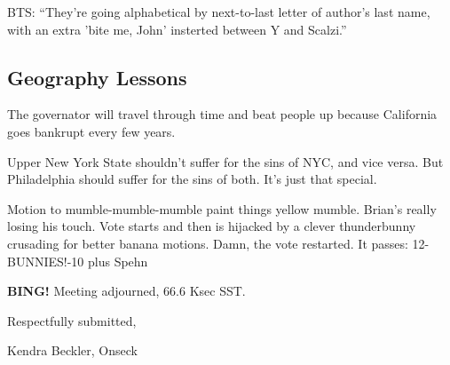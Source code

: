 \documentclass[10pt]{article}
\newcommand{\bing}{{\bf BING!} }
\newcommand{\ps}{ plus Spehn\xspace}
\newcommand{\onseck}{Kendra Beckler, Onseck}
\begin{document}
BTS: ``They're going alphabetical by next-to-last letter of author's last name, with an extra 'bite me, John' insterted between Y and Scalzi.''

\subsection*{Geography Lessons}

The governator will travel through time and beat people up because California goes bankrupt every few years.

Upper New York State shouldn't suffer for the sins of NYC, and vice versa.  But Philadelphia should suffer for the sins of both.  It's just that special.

Motion to mumble-mumble-mumble paint things yellow mumble.  Brian's really losing his touch.  Vote starts and then is hijacked by a clever thunderbunny crusading for better banana motions.  Damn, the vote restarted.  It passes: 12-BUNNIES!-10 \ps

\bing
\noindent
Meeting adjourned, 66.6 Ksec SST.

\vspace{18pt}

\centerline{Respectfully submitted,}
\centerline{\onseck}
\end{document}
